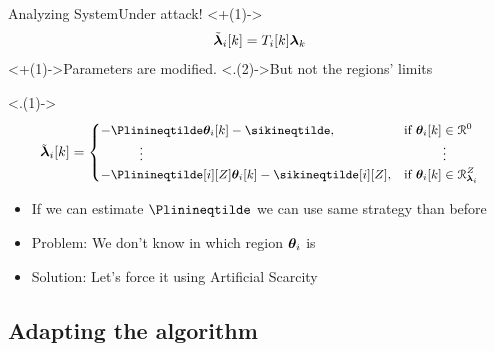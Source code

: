 \documentclass[aspectratio=169]{beamer}
\begin{document}
\begin{frame}{Analyzing System}{Under attack!}
  \centering
  \vspace{-1cm}
  \onslide<+(1)->{
    \begin{equation*}
      \tilde{\boldsymbol{\lambda}}_{i}[k]=T_{i}[k]\boldsymbol{\lambda}_{k}
    \end{equation*}
  }
  \onslide<+(1)->{Parameters are modified.} \onslide<.(2)->{But not the regions' limits}

  \onslide<.(1)->{
  \begin{equation*}
    \small
      \lambdaicheat[k]=
      \begin{cases}
        -\Plinineqtilde      \thetaik-\sikineqtilde      ,&\text{if }\thetaik\in\set{R}^{0}\tikzmark{a}\\
        \qquad\quad \vdots&\qquad\quad \vdots\\
        -\Plinineqtilde[i][Z]\thetaik-\sikineqtilde[i][Z],&\text{if}\ \thetaik \in\set{R}_{\lambdai}^{Z}\\
      \end{cases}
  \end{equation*}
  }

  \begin{itemize}[<+(2)->]
    \item If we can estimate $\Plinineqtilde$ we can use same strategy than before
    \item Problem: We don't know in which region $\boldsymbol{\theta}_{i}$ is
    \item Solution: Let's force it using Artificial Scarcity
  \end{itemize}
\end{frame}

\subsection{Adapting the algorithm}
\end{document}
